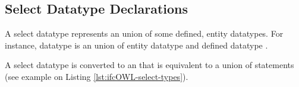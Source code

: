 








 

\subsection{Select Datatype Declarations}
\label{subsec:ifcOWL-select-types}

A select data\-type represents an union of some defined, entity data\-types. For instance, data\-type  is an union of entity data\-type  and defined data\-type .

\begin{ontologyRule}[caption={Defined data\-types}]
A select data\-type is converted to an  that is equivalent to a union of  statements (see example on Listing \ref{lst:ifcOWL-select-types}).
\end{ontologyRule}

